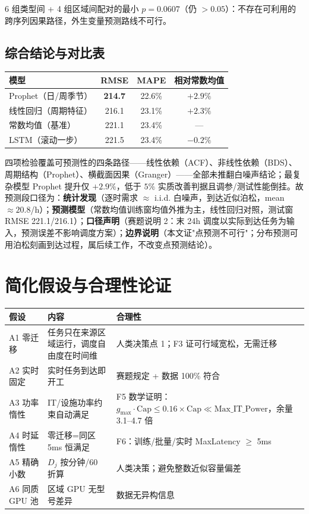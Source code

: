 \documentclass{internal-report}
\begin{document}
6 组类型间 + 4 组区域间配对的最小 $p=0.0607$（仍 $>0.05$）：不存在可利用的跨序列因果路径，外生变量预测路线不可行。

\subsection{综合结论与对比表}

\begin{center}
\begin{tabular}{lccc}
\toprule
模型 & RMSE & MAPE & 相对常数均值 \\
\midrule
Prophet（日/周季节） & \textbf{214.7} & 22.6\% & $+2.9\%$ \\
线性回归（周期特征） & 216.1 & 23.1\% & $+2.3\%$ \\
常数均值（基准） & 221.1 & 23.4\% & --- \\
LSTM（滚动一步） & 221.5 & 23.4\% & $-0.2\%$ \\
\bottomrule
\end{tabular}
\end{center}

四项检验覆盖可预测性的四条路径——线性依赖（ACF）、非线性依赖（BDS）、周期结构（Prophet）、横截面因果（Granger）——全部未推翻白噪声结论；最复杂模型 Prophet 提升仅 $+2.9\%$，低于 $5\%$ 实质改善判据且调参/测试性能倒挂。故预测段口径为：\textbf{统计发现}（逐时需求 $\approx$ i.i.d. 白噪声，到达近似泊松，mean $\approx 20.8$/h）；\textbf{预测模型}（常数均值训练窗均值外推为主，线性回归对照，测试窗 RMSE 221.1/216.1）；\textbf{口径声明}（赛题说明 2：末 24h 调度以实际到达任务为输入，预测误差不影响调度方案）；\textbf{边界说明}（本文证"点预测不可行"；分布预测可用泊松刻画到达过程，属后续工作，不改变点预测结论）。

\section{简化假设与合理性论证}
\label{sec:justify}

\begin{center}
\footnotesize
\begin{tabular}{p{4.2cm}p{5.2cm}p{4.6cm}}
\toprule
假设 & 内容 & 合理性 \\
\midrule
A1 零迁移 & 任务只在来源区域运行，调度自由度在时间维 & 人类决策点 1；F3 证可行域宽松，无需迁移 \\
A2 实时固定 & 实时任务到达即开工 & 赛题规定 + 数据 100\% 符合 \\
A3 功率惰性 & IT/设施功率约束自动满足 & F5 数学证明：$g_{\max} \cdot \text{Cap} \le 0.16 \times \text{Cap} \ll \text{Max\_IT\_Power}$，余量 3.1--4.7 倍 \\
A4 时延惰性 & 零迁移=同区 5ms 恒满足 & F6：训练/批量/实时 MaxLatency $\ge$ 5ms \\
A5 精确小数 & $D_j$ 按分钟/60 折算 & 人类决策；避免整数近似容量偏差 \\
A6 同质 GPU 池 & 区域 GPU 无型号差异 & 数据无异构信息 \\
\bottomrule
\end{tabular}
\end{center}
\end{document}
